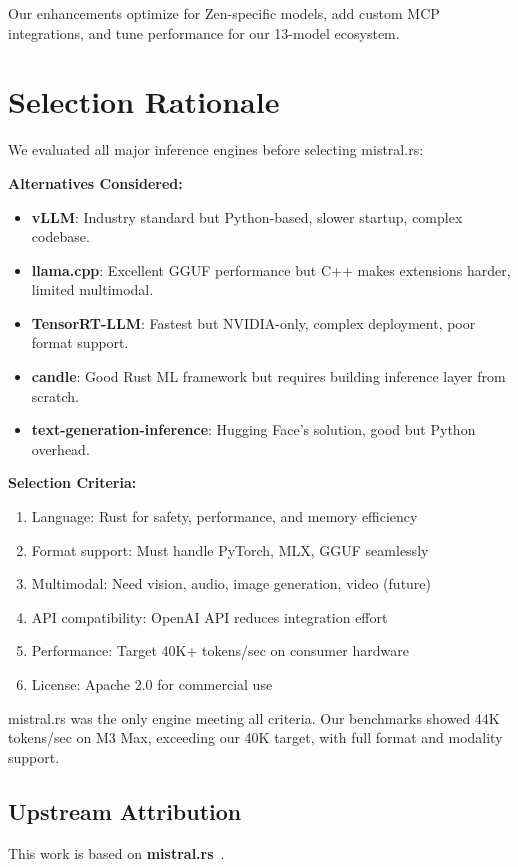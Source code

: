 \documentclass[11pt,a4paper]{article}
\begin{document}
Our enhancements optimize for Zen-specific models, add custom MCP integrations, and tune performance for our 13-model ecosystem.

\section{Selection Rationale}
We evaluated all major inference engines before selecting mistral.rs:

\textbf{Alternatives Considered:}
\begin{itemize}
    \item \textbf{vLLM}: Industry standard but Python-based, slower startup, complex codebase.
    \item \textbf{llama.cpp}: Excellent GGUF performance but C++ makes extensions harder, limited multimodal.
    \item \textbf{TensorRT-LLM}: Fastest but NVIDIA-only, complex deployment, poor format support.
    \item \textbf{candle}: Good Rust ML framework but requires building inference layer from scratch.
    \item \textbf{text-generation-inference}: Hugging Face's solution, good but Python overhead.
\end{itemize}

\textbf{Selection Criteria:}
\begin{enumerate}
    \item Language: Rust for safety, performance, and memory efficiency
    \item Format support: Must handle PyTorch, MLX, GGUF seamlessly
    \item Multimodal: Need vision, audio, image generation, video (future)
    \item API compatibility: OpenAI API reduces integration effort
    \item Performance: Target 40K+ tokens/sec on consumer hardware
    \item License: Apache 2.0 for commercial use
\end{enumerate}

mistral.rs was the only engine meeting all criteria. Our benchmarks showed 44K tokens/sec on M3 Max, exceeding our 40K target, with full format and modality support.

\subsection{Upstream Attribution}
This work is based on \textbf{mistral.rs}~\cite{upstream2025}.
\end{document}
